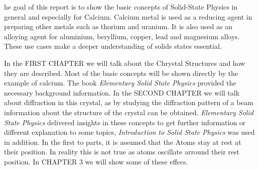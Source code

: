 he goal of this report is to show the basic concepts of Solid-State Physics 
in general and especially for Calcium.
Calcium metal is used as a reducing agent in preparing other metals such as 
thorium and uranium. 
It is also used as an alloying agent for aluminium, beryllium, copper, lead 
and magnesium alloys.
These use cases make a deeper understanding of solids states essential.

In the FIRST CHAPTER we will talk about the Chrystal Structures and how they 
are described.
Most of the basic concepts will be shown directly by the example of calcium. 
The book \textit{Elementary Solid State Physics}
provided the necessary background information. In the SECOND CHAPTER we will 
talk about diffraction in this crystal,
as by studying the diffraction pattern of a beam information about the 
structure of the crystal can be obtained.
\textit{Elementary Solid State Physics} \cite{elementary_SSP} delivered insights in these concepts to get 
further information or different 
explanation to some topics, \textit{Introduction to Solid State Physics} \cite{kittel} was used in addition. 
In the first to parts, it is assumed that the Atoms stay at rest at their
position. In reality this is not true as atoms oscillate arround their
rest position. In CHAPTER 3 we will show some of these effecs.